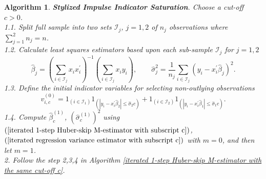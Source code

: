 \documentclass[11pt, letterpaper]{article}
\newtheorem{algorithm}{Algorithm}
\numberwithin{algorithm}{section}
\numberwithin{assumption}{section}
\numberwithin{lemma}{section}
\numberwithin{theorem}{section}
\numberwithin{corollary}{section}
\numberwithin{remark}{section}
\numberwithin{equation}{section}
\numberwithin{figure}{section}
\numberwithin{table}{section}
\begin{document}

\begin{algorithm} \label{impulse indicator saturation algorithm}
\textbf{Stylized Impulse Indicator Saturation}. Choose a cut-off $c > 0$. \\
1.1. Split full sample into two sets $\mathcal{I}_{j}$, $j = 1, 2$ of $n_{j}$ observations where $\sum_{j=1}^{2} n_{j} = n$. \\
1.2. Calculate least squares estimators based upon each sub-sample $\mathcal{I}_{j}$ for $j = 1, 2$
\begin{equation} \label{IIS initial estimator}
\widehat{\beta}_{j} = (\sum_{i \in \mathcal{I}_{j}} x_{i}x_{i}^{\prime})^{-1} (\sum_{i \in \mathcal{I}_{j}} x_{i}y_{i}), \qquad \widehat{\sigma}_{j}^{2} = \frac{1}{n_{j}} \sum_{i \in \mathcal{I}_{j}} (y_{i} - x_{i}^{\prime} \widehat{\beta}_{j})^{2}.
\end{equation}
1.3. Define the initial indicator variables for selecting non-outlying observations
\begin{equation} \label{IIS initial indicator}
v_{i, c}^{(0)} = 1_{(i \in \mathcal{I}_{1})} 1_{(|y_{i} - x_{i}^{\prime}\widehat{\beta}_{2}| \le \widehat{\sigma}_{2}c)} + 1_{(i \in \mathcal{I}_{2})} 1_{(|y_{i} - x_{i}^{\prime}\widehat{\beta}_{1}| \le \widehat{\sigma}_{1}c)}.
\end{equation}
1.4. Compute $\widehat{\beta}_{c}^{(1)}$, $(\widehat{\sigma}_{c}^{(1)})^{2}$ using $(\ref{iterated 1-step Huber-skip M-estimator with subscript c})$, $(\ref{iterated regression variance estimator with subscript c})$ with $m = 0$, and then let $m = 1$. \\
2. Follow the step 2,3,4 in Algorithm \ref{iterated 1-step Huber-skip M-estimator with the same cut-off c}.
\end{algorithm}
\end{document}
